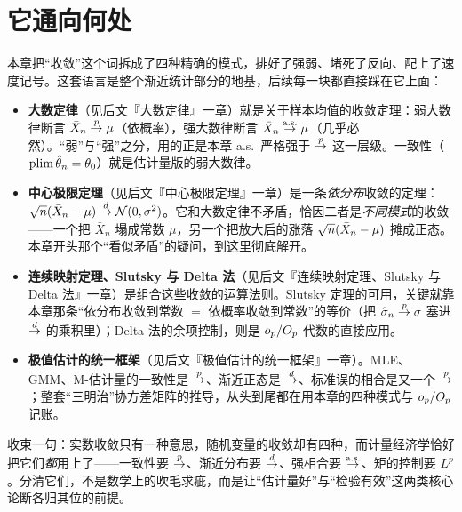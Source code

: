 
\section{它通向何处}
\label{sec:convergence-6}

本章把``收敛''这个词拆成了四种精确的模式，排好了强弱、堵死了反向、配上了速度记号。这套语言是整个渐近统计部分的地基，后续每一块都直接踩在它上面：

\begin{itemize}
    \item \textbf{大数定律}（见后文『大数定律』一章）就是关于样本均值的收敛定理：弱大数律断言 $\bar X_n\overset{p}{\to}\mu$（依概率），强大数律断言 $\bar X_n\overset{\mathrm{a.s.}}{\to}\mu$（几乎必然）。``弱''与``强''之分，用的正是本章 a.s.\ 严格强于 $\overset{p}{\to}$ 这一层级。一致性（$\operatorname{plim}\hat\theta_n=\theta_0$）就是估计量版的弱大数律。
    \item \textbf{中心极限定理}（见后文『中心极限定理』一章）是一条\emph{依分布}收敛的定理：$\sqrt{n}(\bar X_n-\mu)\overset{d}{\to}\mathcal{N}(0,\sigma^2)$。它和大数定律不矛盾，恰因二者是\emph{不同模式}的收敛——一个把 $\bar X_n$ 塌成常数 $\mu$，另一个把放大后的涨落 $\sqrt{n}(\bar X_n-\mu)$ 摊成正态。本章开头那个``看似矛盾''的疑问，到这里彻底解开。
    \item \textbf{连续映射定理、Slutsky 与 Delta 法}（见后文『连续映射定理、Slutsky 与 Delta 法』一章）是组合这些收敛的运算法则。Slutsky 定理的可用，关键就靠本章那条``依分布收敛到常数 $=$ 依概率收敛到常数''的等价（把 $\hat\sigma_n\overset{p}{\to}\sigma$ 塞进 $\overset{d}{\to}$ 的乘积里）；Delta 法的余项控制，则是 $o_{p}/O_{p}$ 代数的直接应用。
    \item \textbf{极值估计的统一框架}（见后文『极值估计的统一框架』一章）。MLE、GMM、M-估计量的一致性是 $\overset{p}{\to}$、渐近正态是 $\overset{d}{\to}$、标准误的相合是又一个 $\overset{p}{\to}$；整套``三明治''协方差矩阵的推导，从头到尾都在用本章的四种模式与 $o_{p}/O_{p}$ 记账。
\end{itemize}

收束一句：实数收敛只有一种意思，随机变量的收敛却有四种，而计量经济学恰好把它们\emph{都}用上了——一致性要 $\overset{p}{\to}$、渐近分布要 $\overset{d}{\to}$、强相合要 $\overset{\mathrm{a.s.}}{\to}$、矩的控制要 $L^p$。分清它们，不是数学上的吹毛求疵，而是让``估计量好''与``检验有效''这两类核心论断各归其位的前提。
